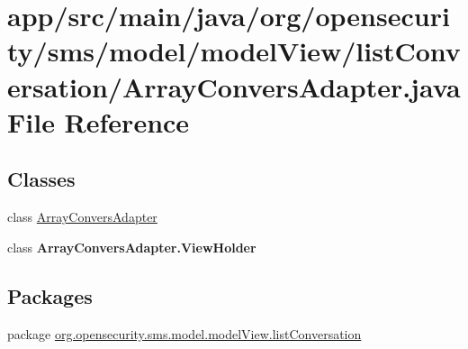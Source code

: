 \hypertarget{a00023}{\section{app/src/main/java/org/opensecurity/sms/model/model\+View/list\+Conversation/\+Array\+Convers\+Adapter.java File Reference}
\label{a00023}
}
\subsection*{Classes}
\begin{DoxyCompactItemize}
\item 
class \hyperlink{a00003}{Array\+Convers\+Adapter}
\item 
class {\bfseries Array\+Convers\+Adapter.\+View\+Holder}
\end{DoxyCompactItemize}
\subsection*{Packages}
\begin{DoxyCompactItemize}
\item 
package \hyperlink{a00039}{org.\+opensecurity.\+sms.\+model.\+model\+View.\+list\+Conversation}
\end{DoxyCompactItemize}
